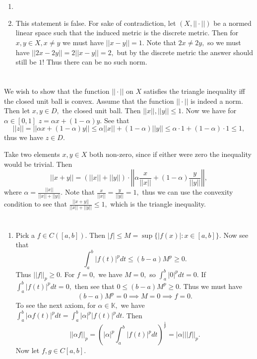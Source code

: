 \documentclass{article}
\title{} %
\author{Gandhar Kulkarni (mmat2304)} %
\date{} %
\begin{document}
\maketitle %


\section{} %
\begin{enumerate}
	\item
	\item This statement is false. For sake of contradiction, let $(X,||\cdot||)$ be a normed linear space such that the induced metric is the discrete 
	metric. Then for $x,y \in X, x \neq y$ we must have $||x-y|| =1.$ Note that $2x\neq 2y,$ so we must have $||2x-2y||=2||x-y||=2,$ but by the discrete 
	metric the answer should still be $1!$ Thus there can be no such norm.
\end{enumerate}
\section{} %
We wish to show that the function $||\cdot|| $ on $X$ satisfies the triangle inequality iff the closed unit ball is convex.
Assume that the function $||\cdot||$ is indeed a norm. Then let $x,y \in D,$ the closed unit ball. Then $||x||,||y|| \leq 1.$ Now we have for $\alpha \in 
[0,1]$ $z=\alpha x+(1-\alpha)y.$ See that $$||z|| =||\alpha x+(1-\alpha)y|| \leq \alpha ||x|| + (1-\alpha) ||y|| \leq \alpha \cdot 1 + (1-\alpha) \cdot 1 
\leq 1,$$ thus we have $z \in D.$

Take two elements $x,y \in X$ both non-zero, since if either were zero the inequality would be trivial. Then $$||x+y|| = (||x||+||y||)\cdot 
\left|\left|\alpha \frac{x}{||x||}+ (1-\alpha)\frac{y}{||y||}\right|\right|,$$ where $\alpha=\frac{||x||}{||x||+||y||}.$ Note that 
$\frac{x}{||x||}=\frac{y}{||y||}=1,$ thus we can use the convexity condition to see that $\frac{||x+y||}{||x||+||y||} \leq 1,$ which is the triangle 
inequality.
\section{} %
\begin{enumerate}
	\item Pick a $f \in C([a,b]).$ Then $|f|\leq M=\sup\{|f(x)|:x \in [a,b]\}.$ Now see that $$\int_a^b|f(t)|^pdt \leq (b-a)M^p \geq 0.$$ Thus $||f||_p \geq 
	0.$
	For $f=0,$ we have $M=0,$ so $\int_a^b|0|^pdt=0.$ If $\int_a^b|f(t)|^pdt =0,$ then see that $0 \leq (b-a)M^p \geq 0.$ Thus we must have $$(b-a)M^p=0 
	\implies M=0 \implies f=0.$$ To see the next axiom, for $\alpha \in \mathbb{K},$ we have $\int_a^b|\alpha f(t)|^pdt =\int_a^b|\alpha|^p|f(t)|^pdt.$
	Then $$||\alpha f||_p= \left(|\alpha|^p\int_a^b|f(t)|^pdt\right)^{\frac{1}{p}} =|\alpha| ||f||_p.$$
	Now let $f,g \in C[a,b].$ 

\end{enumerate}
\end{document}
